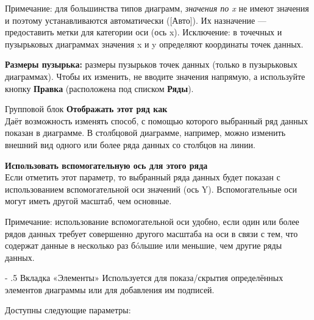 \documentclass[a4paper,10pt]{article}
\makeatletter
\newenvironment{myindentpar}[1]%
 {\begin{list}{}%
         {\setlength{\leftmargin}{#1}}%
         \item[]%
 }
 {\end{list}}
\renewcommand\paragraph{%
   \@startsection{paragraph}{4}{0mm}%
      {-\baselineskip}%
      {.5\baselineskip}%
      {\normalfont\normalsize\bfseries}}
\makeatother
\begin{document}
\begin{itemize}
\begin{myindentpar}{1cm}
 Примечание: для большинства типов диаграмм, \textit{значения по x} не имеют значения и поэтому устанавливаются автоматически ([Авто]). Их назначение --- предоставить метки для категории оси (ось x). Исключение: в точечных и пузырьковых диаграммах значения x и y определяют координаты точек данных.
\end{myindentpar}

\textbf{Размеры пузырька:} размеры пузырьков точек данных (только в пузырьковых диаграммах). Чтобы их изменить, не вводите значения напрямую, а используйте кнопку \textbf{Правка} (расположена под списком \textbf{Ряды}).

\item Групповой блок \textbf{Отображать этот ряд как}\\
Даёт возможность изменять способ, с помощью которого выбранный ряд данных показан в диаграмме. В столбцовой диаграмме, например, можно изменить внешний вид одного или более ряда данных со столбцов на линии.
\item \textbf{Использовать вспомогательную ось для этого ряда}\\
Если отметить этот параметр, то выбранный ряда данных будет показан с использованием вспомогательной оси значений (ось Y). Вспомогательные оси могут иметь другой масштаб, чем основные.

\begin{myindentpar}{1cm}
 Примечание: использование вспомогательной оси удобно, если один или более рядов данных требует совершенно другого масштаба на оси в связи с тем, что содержат данные в несколько раз б\'{o}льшие или меньшие, чем другие ряды данных.
\end{myindentpar}
 \end{itemize}
 
 \paragraph{Вкладка «Элементы»}
 Используется для показа/скрытия определённых элементов диаграммы или для добавления им подписей.
 
 Доступны следующие параметры:
 
\end{document}
